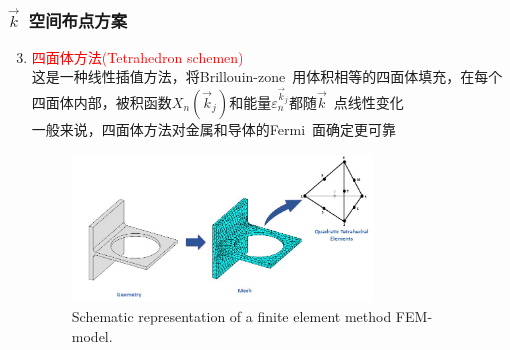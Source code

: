 \frame
{
\frametitle{$\vec k$~空间布点方案}
\begin{enumerate}
	\setcounter{enumi}{2}
	\item \textcolor{red}{四面体方法\textrm{(Tetrahedron schemen)}}\\这是一种线性插值方法，将\textrm{Brillouin-zone~}用体积相等的四面体填充，在每个四面体内部，被积函数$X_n(\vec k_j)$和能量$\varepsilon_n^{\vec k_j}$都随$\vec k$~点线性变化\\一般来说，四面体方法对金属和导体的\textrm{Fermi~}面确定更可靠
\begin{figure}[h!]
\centering
	\includegraphics[height=1.55in,width=3.15in,viewport=30 0 900 500,clip]{Figures/Finite_element_analysis.jpg}
	\caption{\tiny \textrm{Schematic representation of a finite element method FEM-model.}}%
\label{Fig:FEM}
\end{figure}
\end{enumerate}
}


